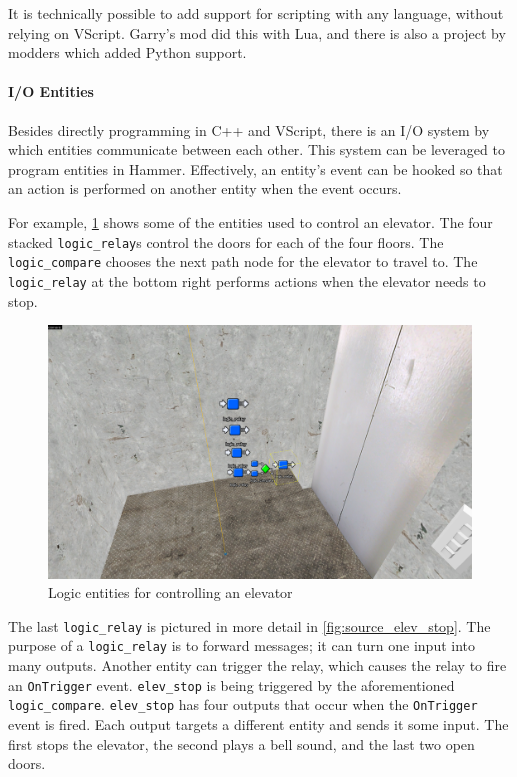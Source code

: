 \documentclass[a4paper, 12pt]{scrartcl}
\begin{document}
It is technically possible to add support for scripting with any language, without relying on VScript. Garry's mod did this with Lua, and there is also a project by modders which added Python support.

\paragraph{I/O Entities}
Besides directly programming in C++ and VScript, there is an I/O system by which entities communicate between each other. This system can be leveraged to program entities in Hammer. Effectively, an entity's event can be hooked so that an action is performed on another entity when the event occurs.

For example, \cref{fig:source_entities} shows some of the entities used to control an elevator. The four stacked \texttt{logic\_relay}s control the doors for each of the four floors. The \texttt{logic\_compare} chooses the next path node for the elevator to travel to. The \texttt{logic\_relay} at the bottom right performs actions when the elevator needs to stop.

\begin{figure}[!htb]
  \centering
  \includegraphics[width=0.75\linewidth]{images/source_io_entities.png}
  \caption{Logic entities for controlling an elevator}
  \label{fig:source_entities}
\end{figure}

The last \texttt{logic\_relay} is pictured in more detail in \cref{fig:source_elev_stop}. The purpose of a \texttt{logic\_relay} is to forward messages; it can turn one input into many outputs. Another entity can trigger the relay, which causes the relay to fire an \texttt{OnTrigger} event. \texttt{elev\_stop} is being triggered by the aforementioned \texttt{logic\_compare}. \texttt{elev\_stop} has four outputs that occur when the \texttt{OnTrigger} event is fired. Each output targets a different entity and sends it some input. The first stops the elevator, the second plays a bell sound, and the last two open doors.
\end{document}
